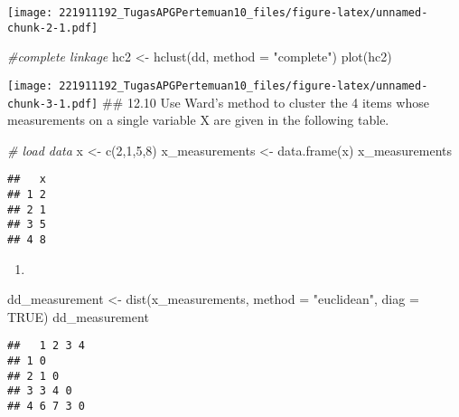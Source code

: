 \documentclass[
]{article}
\newenvironment{Shaded}{\begin{snugshade}}{\end{snugshade}}
\newcommand{\AttributeTok}[1]{\textcolor[rgb]{0.77,0.63,0.00}{#1}}
\newcommand{\CommentTok}[1]{\textcolor[rgb]{0.56,0.35,0.01}{\textit{#1}}}
\newcommand{\ConstantTok}[1]{\textcolor[rgb]{0.00,0.00,0.00}{#1}}
\newcommand{\DecValTok}[1]{\textcolor[rgb]{0.00,0.00,0.81}{#1}}
\newcommand{\FunctionTok}[1]{\textcolor[rgb]{0.00,0.00,0.00}{#1}}
\newcommand{\NormalTok}[1]{#1}
\newcommand{\OtherTok}[1]{\textcolor[rgb]{0.56,0.35,0.01}{#1}}
\newcommand{\StringTok}[1]{\textcolor[rgb]{0.31,0.60,0.02}{#1}}
\providecommand{\tightlist}{%
  \setlength{\itemsep}{0pt}\setlength{\parskip}{0pt}}
\begin{document}
\texttt{[image: 221911192\_TugasAPGPertemuan10\_files/figure-latex/unnamed-chunk-2-1.pdf]}

\begin{Shaded}
\begin{Highlighting}[]
\CommentTok{\#complete linkage}
\NormalTok{hc2 }\OtherTok{\textless{}{-}} \FunctionTok{hclust}\NormalTok{(dd, }\AttributeTok{method =} \StringTok{"complete"}\NormalTok{)}
\FunctionTok{plot}\NormalTok{(hc2)}
\end{Highlighting}
\end{Shaded}

\texttt{[image: 221911192\_TugasAPGPertemuan10\_files/figure-latex/unnamed-chunk-3-1.pdf]}
\#\# 12.10 Use Ward's method to cluster the 4 items whose measurements
on a single variable X are given in the following table.

\begin{Shaded}
\begin{Highlighting}[]
\CommentTok{\# load data}
\NormalTok{x }\OtherTok{\textless{}{-}} \FunctionTok{c}\NormalTok{(}\DecValTok{2}\NormalTok{,}\DecValTok{1}\NormalTok{,}\DecValTok{5}\NormalTok{,}\DecValTok{8}\NormalTok{)}
\NormalTok{x\_measurements }\OtherTok{\textless{}{-}} \FunctionTok{data.frame}\NormalTok{(x)}
\NormalTok{x\_measurements}
\end{Highlighting}
\end{Shaded}

\begin{verbatim}
##   x
## 1 2
## 2 1
## 3 5
## 4 8
\end{verbatim}

\begin{enumerate}
\def\labelenumi{\alph{enumi})}
\tightlist
\item
\end{enumerate}

\begin{Shaded}
\begin{Highlighting}[]
\NormalTok{dd\_measurement }\OtherTok{\textless{}{-}} \FunctionTok{dist}\NormalTok{(x\_measurements, }\AttributeTok{method =} \StringTok{"euclidean"}\NormalTok{, }\AttributeTok{diag =} \ConstantTok{TRUE}\NormalTok{)}
\NormalTok{dd\_measurement}
\end{Highlighting}
\end{Shaded}

\begin{verbatim}
##   1 2 3 4
## 1 0      
## 2 1 0    
## 3 3 4 0  
## 4 6 7 3 0
\end{verbatim}
\end{document}
